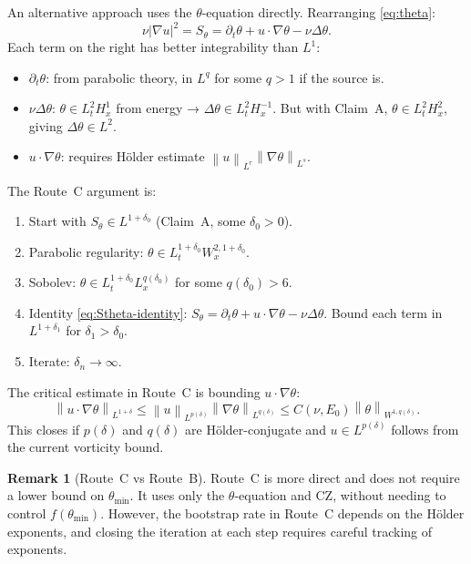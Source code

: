 \documentclass[11pt]{article}
\theoremstyle{definition}
\newtheorem{remark}[theorem]{Remark}
\theoremstyle{remark}
\newcommand{\norm}[1]{\left\|#1\right\|}
\newcommand{\Hs}[1]{H^{#1}}
\newcommand{\prt}{\partial_t}
\newcommand{\grad}{\nabla}
\newcommand{\Sth}{S_\theta}
\begin{document}
An alternative approach uses the $\theta$-equation directly.  Rearranging
\eqref{eq:theta}:
\begin{equation}\label{eq:Stheta-identity}
  \nu|\grad u|^2 = \Sth = \prt\theta + u\cdot\grad\theta - \nu\Delta\theta.
\end{equation}
Each term on the right has better integrability than $L^1$:
\begin{itemize}
\item $\prt\theta$: from parabolic theory, in $L^q$ for some $q>1$ if the source is.
\item $\nu\Delta\theta$: $\theta\in L^2_t\Hs{1}_x$ from energy → $\Delta\theta\in L^2_tH^{-1}_x$.
  But with Claim~A, $\theta\in L^2_t\Hs{2}_x$, giving $\Delta\theta\in L^2$.
\item $u\cdot\grad\theta$: requires Hölder estimate $\norm{u}_{L^r}\norm{\grad\theta}_{L^s}$.
\end{itemize}

The Route~C argument is:
\begin{enumerate}
\item Start with $\Sth\in L^{1+\delta_0}$ (Claim~A, some $\delta_0>0$).
\item Parabolic regularity: $\theta\in L^{1+\delta_0}_tW^{2,1+\delta_0}_x$.
\item Sobolev: $\theta\in L^{1+\delta_0}_t L^{q(\delta_0)}_x$ for some $q(\delta_0)>6$.
\item Identity \eqref{eq:Stheta-identity}: $\Sth = \prt\theta + u\cdot\grad\theta - \nu\Delta\theta$.
  Bound each term in $L^{1+\delta_1}$ for $\delta_1>\delta_0$.
\item Iterate: $\delta_n\to\infty$.
\end{enumerate}

The critical estimate in Route~C is bounding $u\cdot\grad\theta$:
\begin{equation}\label{eq:routeC-critical}
  \norm{u\cdot\grad\theta}_{L^{1+\delta}}
  \leq \norm{u}_{L^{p(\delta)}}\norm{\grad\theta}_{L^{q(\delta)}}
  \leq C(\nu,E_0)\norm{\theta}_{W^{1,q(\delta)}}.
\end{equation}
This closes if $p(\delta)$ and $q(\delta)$ are Hölder-conjugate and
$u\in L^{p(\delta)}$ follows from the current vorticity bound.

\begin{remark}[Route~C vs Route~B]
  Route~C is more direct and does not require a lower bound on $\theta_{\min}$.
  It uses only the $\theta$-equation and CZ, without needing to control
  $f(\theta_{\min})$.  However, the bootstrap rate in Route~C depends on
  the Hölder exponents, and closing the iteration at each step requires
  careful tracking of exponents.
\end{remark}
\end{document}
